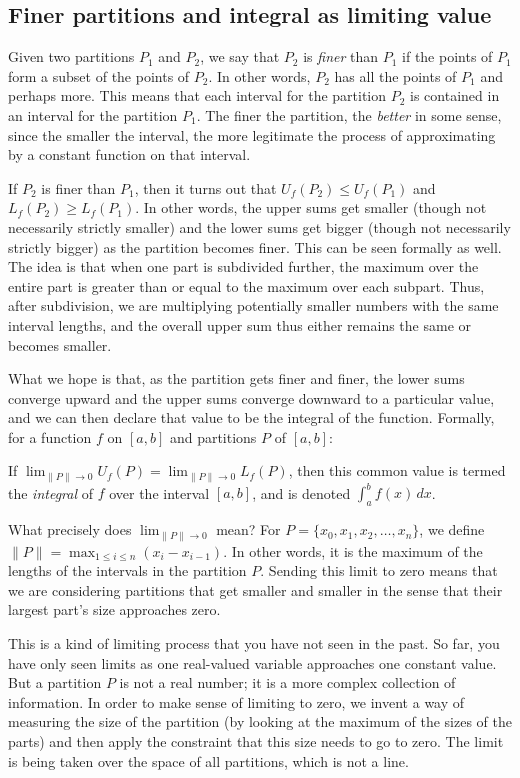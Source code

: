\documentclass{amsart}
\begin{document}
\subsection{Finer partitions and integral as limiting value}

Given two partitions $P_1$ and $P_2$, we say that $P_2$ is {\em finer}
than $P_1$ if the points of $P_1$ form a subset of the points of
$P_2$. In other words, $P_2$ has all the points of $P_1$ and perhaps
more. This means that each interval for the partition $P_2$ is
contained in an interval for the partition $P_1$. The finer the
partition, the {\em better} in some sense, since the smaller the
interval, the more legitimate the process of approximating by a
constant function on that interval.

If $P_2$ is finer than $P_1$, then it turns out that $U_f(P_2) \le
U_f(P_1)$ and $L_f(P_2) \ge L_f(P_1)$. In other words, the upper sums
get smaller (though not necessarily strictly smaller) and the lower
sums get bigger (though not necessarily strictly bigger) as the
partition becomes finer. This can be seen formally as well. The idea
is that when one part is subdivided further, the maximum over the
entire part is greater than or equal to the maximum over each
subpart. Thus, after subdivision, we are multiplying potentially
smaller numbers with the same interval lengths, and the overall upper
sum thus either remains the same or becomes smaller.

What we hope is that, as the partition gets finer and finer, the lower
sums converge upward and the upper sums converge downward to a
particular value, and we can then declare that value to be the
integral of the function. Formally, for a function $f$ on $[a,b]$ and
partitions $P$ of $[a,b]$:

If $\lim_{\| P \| \to 0} U_f(P) = \lim_{\| P \| \to 0} L_f(P)$, then
this common value is termed the {\em integral} of $f$ over the
interval $[a,b]$, and is denoted $\int_a^b f(x) \, dx$.

What precisely does $\lim_{\| P \| \to 0}$ mean? For $P = \{ x_0, x_1,
x_2, \dots, x_n \}$, we define $\| P \| = \max_{1 \le i \le n} (x_i -
x_{i - 1})$. In other words, it is the maximum of the lengths of the
intervals in the partition $P$. Sending this limit to zero means that
we are considering partitions that get smaller and smaller in the
sense that their largest part's size approaches zero.

This is a kind of limiting process that you have not seen in the
past. So far, you have only seen limits as one real-valued variable
approaches one constant value. But a partition $P$ is not a real
number; it is a more complex collection of information. In order to
make sense of limiting to zero, we invent a way of measuring the size
of the partition (by looking at the maximum of the sizes of the parts)
and then apply the constraint that this size needs to go to zero. The
limit is being taken over the space of all partitions, which is not a
line.
\end{document}
